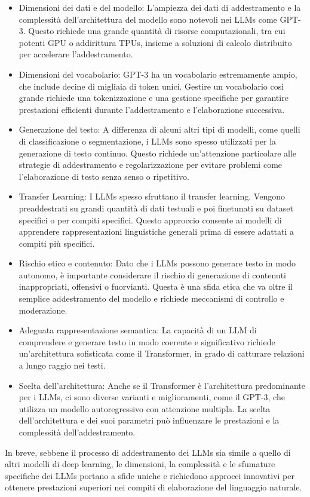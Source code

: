 \begin{itemize}
    \item Dimensioni dei dati e del modello: L'ampiezza dei dati di addestramento e la complessità dell'architettura del modello sono notevoli nei LLMs come GPT-3. Questo richiede una grande quantità di risorse computazionali, tra cui potenti GPU o addirittura TPUs, insieme a soluzioni di calcolo distribuito per accelerare l'addestramento.
    \item Dimensioni del vocabolario: GPT-3 ha un vocabolario estremamente ampio, che include decine di migliaia di token unici. Gestire un vocabolario così grande richiede una tokenizzazione e una gestione specifiche per garantire prestazioni efficienti durante l'addestramento e l'elaborazione successiva.
    \item Generazione del testo: A differenza di alcuni altri tipi di modelli, come quelli di classificazione o segmentazione, i LLMs sono spesso utilizzati per la generazione di testo continuo. Questo richiede un'attenzione particolare alle strategie di addestramento e regolarizzazione per evitare problemi come l'elaborazione di testo senza senso o ripetitivo.
    \item Transfer Learning: I LLMs spesso sfruttano il transfer learning. Vengono preaddestrati su grandi quantità di dati testuali e poi finetunati su dataset specifici o per compiti specifici. Questo approccio consente ai modelli di apprendere rappresentazioni linguistiche generali prima di essere adattati a compiti più specifici.
    \item Rischio etico e contenuto: Dato che i LLMs possono generare testo in modo autonomo, è importante considerare il rischio di generazione di contenuti inappropriati, offensivi o fuorvianti. Questa è una sfida etica che va oltre il semplice addestramento del modello e richiede meccanismi di controllo e moderazione.
    \item Adeguata rappresentazione semantica: La capacità di un LLM di comprendere e generare testo in modo coerente e significativo richiede un'architettura sofisticata come il Transformer, in grado di catturare relazioni a lungo raggio nei testi.
    \item Scelta dell'architettura: Anche se il Transformer è l'architettura predominante per i LLMs, ci sono diverse varianti e miglioramenti, come il GPT-3, che utilizza un modello autoregressivo con attenzione multipla. La scelta dell'architettura e dei suoi parametri può influenzare le prestazioni e la complessità dell'addestramento.

\end{itemize}
In breve, sebbene il processo di addestramento dei LLMs sia simile a quello di altri modelli di deep learning, le dimensioni, la complessità e le sfumature specifiche dei LLMs portano a sfide uniche e richiedono approcci innovativi per ottenere prestazioni superiori nei compiti di elaborazione del linguaggio naturale.


